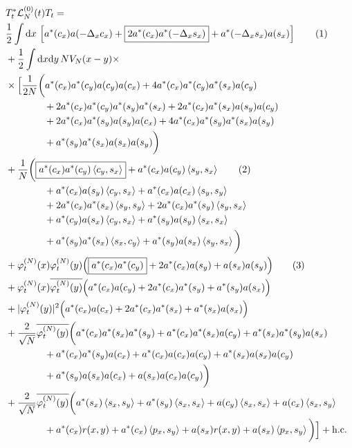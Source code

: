 \documentclass[11pt,a4paper,twoside,headsepline]{scrartcl}
\newcommand{\di}{\textrm{d}}		%
\newcommand{\Lcal}{\mathcal{L}}		%
\newcommand{\hc}{\mbox{h.c.}}		%
\newcommand{\scal}[2]{\left<#1,#2\right>} %
\newcommand{\cc}[1]{\overline{#1}}	%
\newcommand{\ph}{\varphi_t^{(N)}}	%
\newcommand{\tagg}[1]{ \stepcounter{equation} \tag{\theequation} \label{eq:#1} } %
\begin{document}
\begin{align*}
& T^*_t \Lcal_N^{(0)}(t) T_t = \\ 
& \frac{1}{2} \int \di x\, \left[ a^*(c_x) a(-\Delta_x c_x) + \boxed{2 a^*(c_x) a^*(-\Delta_x s_x)} + a^*(-\Delta_x s_x) a(s_x) \right] \tagg{cancellation_kinetic} \\
& + \frac{1}{2}\int \di x \di y\, NV_N(x-y) \times \\
& \times \Big[   \frac{1}{2N}\bigg( a^*(c_x) a^*(c_y) a(c_y) a(c_x) + 4 a^*(c_x) a^*(c_y) a^*(s_x) a(c_y) \\
				      & \qquad\qquad + 2 a^*(c_x) a^*(c_y) a^*(s_y) a^*(s_x) + 2 a^*(c_x) a^*(s_x) a(s_y) a(c_y) \\
				      & \qquad\qquad + 2 a^*(c_x) a^*(s_y) a(s_y) a(c_x) + 4 a^*(c_x) a^*(s_y) a^*(s_x) a(s_y) \\
				      & \qquad\qquad + a^*(s_y) a^*(s_x) a(s_x) a(s_y) \bigg) \\
& + \frac{1}{N}\bigg(   \boxed{a^*(c_x)a^*(c_y) \scal{c_y}{s_x}} + a^*(c_x) a(c_y) \scal{s_y}{s_x} \tagg{cancellation_normalorder} \\
			& \qquad\qquad + a^*(c_x) a(s_y) \scal{c_y}{s_x} + a^*(c_x) a(c_x) \scal{s_y}{s_y} \\
			& \qquad\qquad + 2 a^*(c_x) a^*(s_x) \scal{s_y}{s_y} + 2a^*(c_x)a^*(s_y) \scal{s_y}{s_x} \\
			& \qquad\qquad + a^*(c_y) a(s_x) \scal{c_y}{s_x} +  a^*(s_y) a(s_y) \scal{s_x}{s_x}\\
			& \qquad\qquad + a^*(s_y) a^*(s_x) \scal{s_x}{c_y} + a^*(s_y) a(s_x) \scal{s_y}{s_x}   \bigg) \\
& + \ph(x)\ph(y) \Big( \boxed{a^*(c_x) a^*(c_y)} + 2 a^*(c_x) a(s_y) +a(s_x) a(s_y) \Big) \tagg{cancellation_standard} \\
& + \ph(x) \cc{\ph(y)} \Big( a^*(c_x) a(c_y) + 2 a^*(c_x) a^*(s_y) + a^*(s_y) a(s_x) \Big) \\
& + \lvert \ph(y) \rvert^2 \Big( a^*(c_x) a(c_x) + 2 a^*(c_x) a^*(s_x) + a^*(s_x) a(s_x) \Big) \\
& + \frac{2}{\sqrt{N}}\cc{\ph(y)} \bigg(    a^*(c_x) a^*(s_x) a^*(s_y) + a^*(c_x) a^*(s_x) a(c_y) + a^*(s_x) a^*(s_y) a(s_x)\\
					    & \qquad\qquad + a^*(c_x) a^*(s_y) a(c_x) + a^*(c_x) a(c_x) a(c_y)+ a^*(s_x) a(s_x) a(c_y) \\
					    & \qquad\qquad + a^*(s_y) a(s_x) a(c_x) + a(s_x) a(c_x) a(c_y)    \bigg) \\
& + \frac{2}{\sqrt{N}}\cc{\ph(y)} \bigg(    a^*(s_x) \scal{s_x}{s_y} + a^*(s_y) \scal{s_x}{s_x}  + a(c_y) \scal{s_x}{s_x} + a(c_x) \scal{s_x}{s_y} \\
					    & \qquad\qquad + a^*(c_x)r(x,y) + a^*(c_x)\scal{p_x}{s_y} + a(s_x)r(x,y) + a(s_x)\scal{p_x}{s_y}		\bigg)    \Big] + \hc
\end{align*}
\end{document}
